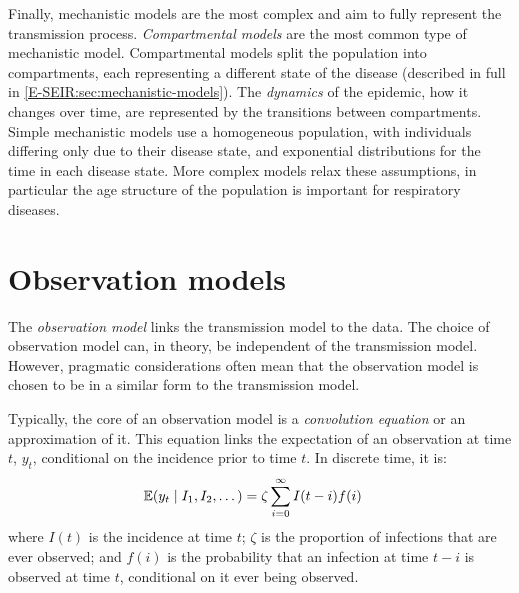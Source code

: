\documentclass[thesis.tex]{subfiles}
\begin{document}
Finally, mechanistic models are the most complex and aim to fully represent the transmission process.
\emph{Compartmental models} are the most common type of mechanistic model.
Compartmental models split the population into compartments, each representing a different state of the disease (described in full in \cref{E-SEIR:sec:mechanistic-models}).
The \emph{dynamics} of the epidemic, how it changes over time, are represented by the transitions between compartments.
Simple mechanistic models use a homogeneous population, with individuals differing only due to their disease state, and exponential distributions for the time in each disease state.
More complex models relax these assumptions, in particular the age structure of the population is important for respiratory diseases.

\section{Observation models}


The \emph{observation model} links the transmission model to the data.
The choice of observation model can, in theory, be independent of the transmission model.
However, pragmatic considerations often mean that the observation model is chosen to be in a similar form to the transmission model.

Typically, the core of an observation model is a \emph{convolution equation} or an approximation of it.
This equation links the expectation of an observation at time $t$, $y_t$, conditional on the incidence prior to time $t$.
In discrete time, it is:
\begin{align}
    \operatorname{\mathbb{E}}(y_t \mid I_1, I_2, \dots) &= \zeta \sum_{i=0}^\infty I(t-i) f(i)
\end{align}
where $I(t)$ is the incidence at time $t$; $\zeta$ is the proportion of infections that are ever observed; and $f(i)$ is the probability that an infection at time $t-i$ is observed at time $t$, conditional on it ever being observed.
\end{document}
